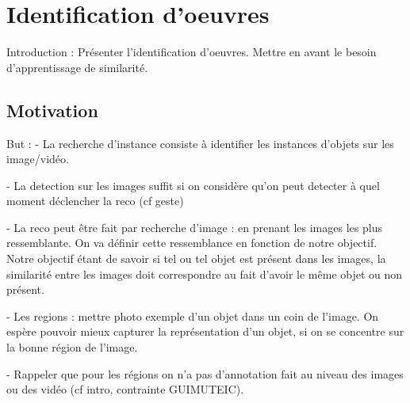 
\chapter{Identification d'oeuvres}
\label{chap:similarite}

Introduction :
Présenter l'identification d'oeuvres.
Mettre en avant le besoin d'apprentissage de similarité.
%

\section{Motivation}
\label{sec:similaritemotivation}


But : 
 - La recherche d'instance consiste à identifier les instances d'objets sur les image/vidéo.
 
 - La detection sur les images suffit si on considère qu'on peut detecter à quel moment déclencher la reco (cf geste)
 
 - La reco peut être fait par recherche d'image : en prenant les images les plus ressemblante. On va définir cette ressemblance en fonction de notre objectif. Notre objectif étant de savoir si tel ou tel objet est présent dans les images, la similarité entre les images doit correspondre au fait d'avoir le même objet ou non présent.
 
 - Les regions : mettre photo exemple d'un objet dans un coin de l'image. On espère pouvoir mieux capturer la représentation d'un objet, si on se concentre sur la bonne région de l'image.
 
 - Rappeler que pour les régions on n'a pas d'annotation fait au niveau des images ou des vidéo (cf intro, contrainte GUIMUTEIC).
 


